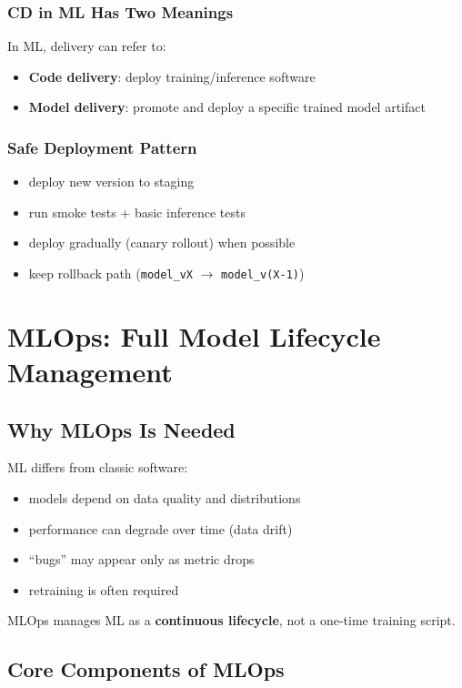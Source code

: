 \documentclass[11pt]{article}
\begin{document}
\subsubsection{CD in ML Has Two Meanings}
In ML, delivery can refer to:
\begin{itemize}
  \item \textbf{Code delivery}: deploy training/inference software
  \item \textbf{Model delivery}: promote and deploy a specific trained model artifact
\end{itemize}

\subsubsection{Safe Deployment Pattern}
\begin{itemize}
  \item deploy new version to staging
  \item run smoke tests + basic inference tests
  \item deploy gradually (canary rollout) when possible
  \item keep rollback path (\texttt{model\_vX} $\rightarrow$ \texttt{model\_v(X-1)})
\end{itemize}

\section{MLOps: Full Model Lifecycle Management}

\subsection{Why MLOps Is Needed}
ML differs from classic software:
\begin{itemize}
  \item models depend on data quality and distributions
  \item performance can degrade over time (data drift)
  \item ``bugs'' may appear only as metric drops
  \item retraining is often required
\end{itemize}

MLOps manages ML as a \textbf{continuous lifecycle}, not a one-time training script.

\subsection{Core Components of MLOps}
\end{document}
